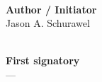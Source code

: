 \documentclass[11pt,a4paper]{article}
\begin{document}
\begin{minipage}{\textwidth}
\vspace{1.1cm} %

\noindent
\begin{minipage}[t]{0.45\textwidth}
  \hrulefill \\[0.4em]
  \textbf{Author / Initiator}\\[0.2em]
  {\small Jason A. Schurawel}
\end{minipage}
\hfill
\begin{minipage}[t]{0.45\textwidth}
  \hrulefill \\[0.4em]
  \textbf{First signatory}\\[0.2em]
  {\small ---}
\end{minipage}
\end{minipage}

\newpage


\end{document}
